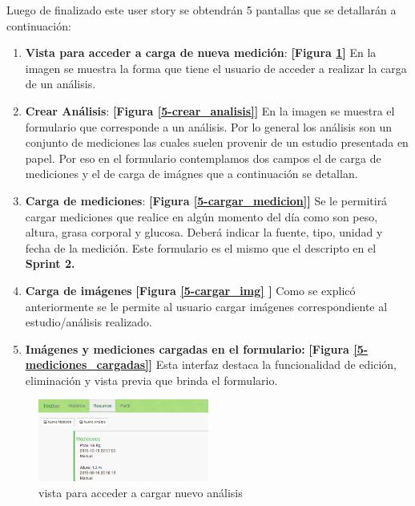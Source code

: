 \documentclass[a4paper,12pt]{article}
\begin{document}
Luego de finalizado este user story se obtendrán 5 pantallas que se detallarán a continuación:
\begin{enumerate}
	\item \textbf{Vista para acceder a carga de nueva medición}: \textbf{[Figura \ref{5-boton_nuevo_analisis}]} En la imagen se muestra la forma que tiene el usuario de acceder  a realizar la carga de un análisis.
    	\item \textbf{Crear Análisis}: \textbf{[Figura \ref{5-crear_analisis}]} En la imagen se muestra el formulario que corresponde a un análisis. Por lo general los análisis son un conjunto de mediciones las cuales suelen provenir de un estudio presentada en papel. Por eso en el formulario contemplamos dos campos el de carga de mediciones y el de carga de imágnes que a continuación se detallan.
        	\item \textbf{Carga de mediciones}: \textbf{[Figura \ref{5-cargar_medicion}]} Se le permitirá cargar mediciones que realice en algún momento del día como son peso, altura, grasa corporal y glucosa. Deberá indicar la fuente, tipo, unidad y fecha de la medición. Este formulario es el mismo que el descripto en el\textbf{ Sprint 2.}
    \item \textbf{Carga de imágenes}  \textbf{[Figura  \ref{5-cargar_img} ]} Como se explicó anteriormente se le permite al usuario cargar imágenes correspondiente al estudio/análisis realizado.

    \item \textbf{Imágenes y mediciones cargadas en el formulario:}  \textbf{[Figura \ref{5-mediciones_cargadas}]} Esta interfaz destaca la funcionalidad de edición, eliminación y vista previa que brinda el formulario.

\end{enumerate}

    
    \begin{figure}[h]
        \centering
        \includegraphics[width=0.5\textwidth]{img/5-boton_nuevo_analisis}
        \caption{vista para acceder a cargar nuevo análisis}
		\label{5-boton_nuevo_analisis}
    \end{figure}
    
\end{document}
